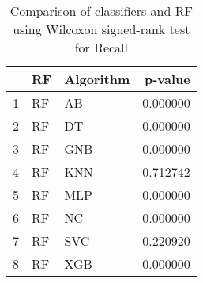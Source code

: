 \begin{table}
\footnotesize
\caption{Comparison of classifiers and RF using Wilcoxon signed-rank test for Recall}
\label{tab:RF wilcoxon Recall comparison}
\begin{tabular}{lllr}
\hline
 & RF & Algorithm & p-value \\
\hline
1 & RF & AB & 0.000000 \\
2 & RF & DT & 0.000000 \\
3 & RF & GNB & 0.000000 \\
4 & RF & KNN & 0.712742 \\
5 & RF & MLP & 0.000000 \\
6 & RF & NC & 0.000000 \\
7 & RF & SVC & 0.220920 \\
8 & RF & XGB & 0.000000 \\
\hline
\end{tabular}
\end{table}
